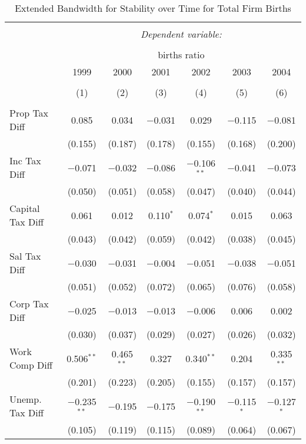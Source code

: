 
\begin{table}[!htbp] \centering 
  \caption{Extended Bandwidth for Stability over Time for  Total Firm Births} 
  \label{-- ebyear} 
\small 
\begin{tabular}{@{\extracolsep{5pt}}lcccccc} 
\\[-1.8ex]\hline 
\hline \\[-1.8ex] 
 & \multicolumn{6}{c}{\textit{Dependent variable:}} \\ 
\cline{2-7} 
\\[-1.8ex] & \multicolumn{6}{c}{births ratio} \\ 
 & 1999 & 2000 & 2001 & 2002 & 2003 & 2004 \\ 
\\[-1.8ex] & (1) & (2) & (3) & (4) & (5) & (6)\\ 
\hline \\[-1.8ex] 
 Prop Tax Diff & 0.085 & 0.034 & $-$0.031 & 0.029 & $-$0.115 & $-$0.081 \\ 
  & (0.155) & (0.187) & (0.178) & (0.155) & (0.168) & (0.200) \\ 
  Inc Tax Diff & $-$0.071 & $-$0.032 & $-$0.086 & $-$0.106$^{**}$ & $-$0.041 & $-$0.073 \\ 
  & (0.050) & (0.051) & (0.058) & (0.047) & (0.040) & (0.044) \\ 
  Capital Tax Diff & 0.061 & 0.012 & 0.110$^{*}$ & 0.074$^{*}$ & 0.015 & 0.063 \\ 
  & (0.043) & (0.042) & (0.059) & (0.042) & (0.038) & (0.045) \\ 
  Sal Tax Diff & $-$0.030 & $-$0.031 & $-$0.004 & $-$0.051 & $-$0.038 & $-$0.051 \\ 
  & (0.051) & (0.052) & (0.072) & (0.065) & (0.076) & (0.058) \\ 
  Corp Tax Diff & $-$0.025 & $-$0.013 & $-$0.013 & $-$0.006 & 0.006 & 0.002 \\ 
  & (0.030) & (0.037) & (0.029) & (0.027) & (0.026) & (0.032) \\ 
  Work Comp Diff & 0.506$^{**}$ & 0.465$^{**}$ & 0.327 & 0.340$^{**}$ & 0.204 & 0.335$^{**}$ \\ 
  & (0.201) & (0.223) & (0.205) & (0.155) & (0.157) & (0.157) \\ 
  Unemp. Tax Diff & $-$0.235$^{**}$ & $-$0.195 & $-$0.175 & $-$0.190$^{**}$ & $-$0.115$^{*}$ & $-$0.127$^{*}$ \\ 
  & (0.105) & (0.119) & (0.115) & (0.089) & (0.064) & (0.067) \\ 

\end{tabular}
\end{table}
